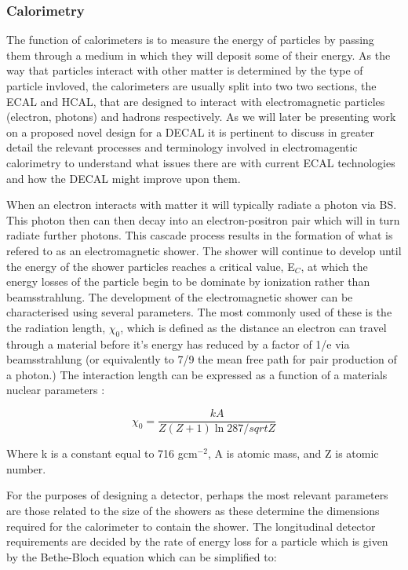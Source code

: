 \subsubsection{Calorimetry}
\label{det:ecal}
The function of calorimeters is to measure the energy of particles by passing them through a medium in which they will deposit some of their energy. As the way that particles interact with other matter is determined by the type of particle invloved, the calorimeters are usually split into two two sections, the \ac{ECAL} and \ac{HCAL}, that are designed to interact with electromagnetic particles (electron, photons) and hadrons respectively. As we will later be presenting work on a proposed novel design for a \ac{DECAL} it is pertinent to discuss in greater detail the relevant processes and terminology involved in electromagentic calorimetry to understand what issues there are with current \ac{ECAL} technologies and how the \ac{DECAL} might improve upon them.

When an electron interacts with matter it will typically radiate a photon via \ac{BS}. This photon then can then decay into an electron-positron pair which will in turn radiate further photons. This cascade process results in the formation of what is refered to as an electromagnetic shower. The shower will continue to develop until the energy of the shower particles reaches a critical value, E$_{C}$, at which the energy losses of the particle begin to be dominate by ionization rather than beamsstrahlung. The development of the electromagnetic shower can be characterised using several parameters. The most commonly used of these is the the radiation length, $\chi_0$, which is defined as the distance an electron can travel through a material before it's energy has reduced by a factor of 1/e via beamsstrahlung (or equivalently to 7/9 the mean free path for pair production of a photon.) The interaction length can be expressed as a function of a materials nuclear parameters \cite{Groom:1998it}:

\begin{equation}
  \chi_0= \frac{kA}{Z(Z+1)\ln{287/sqrt{Z}}}
\end{equation}

Where k is a constant equal to 716 gcm$^{-2}$, A is atomic mass, and Z is atomic number.

For the purposes of designing a detector, perhaps the most relevant parameters are those related to the size of the showers as these determine the dimensions required for the calorimeter to contain the shower. The longitudinal detector requirements are decided by the rate of energy loss for a particle which is given by the Bethe-Bloch equation which can be simplified to\cite{Beringer:1900zz}:

